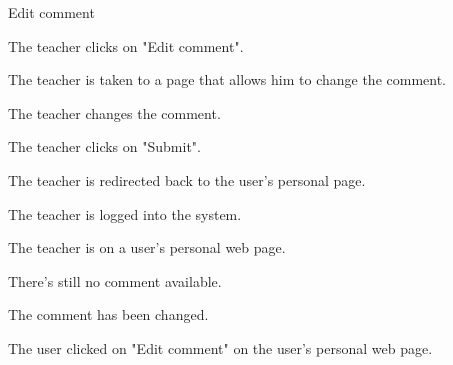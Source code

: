 \begin{uc}{Edit comment}

    \begin{uc-mss}
    \item The teacher clicks on "Edit comment".
    \item The teacher is taken to a page that allows him to change the comment.
    \item The teacher changes the comment.
    \item The teacher clicks on "Submit".
    \item The teacher is redirected back to the user's personal page.
    \end{uc-mss}

    \begin{uc-pre}
    \item The teacher is logged into the system.
    \item The teacher is on a user's personal web page.
		\item There's still no comment available.
    \end{uc-pre}

    \begin{uc-post}
    \item The comment has been changed.
    \end{uc-post}

    \begin{uc-trig}
        The user clicked on "Edit comment" on the user's personal web page.
    \end{uc-trig}

\end{uc}
